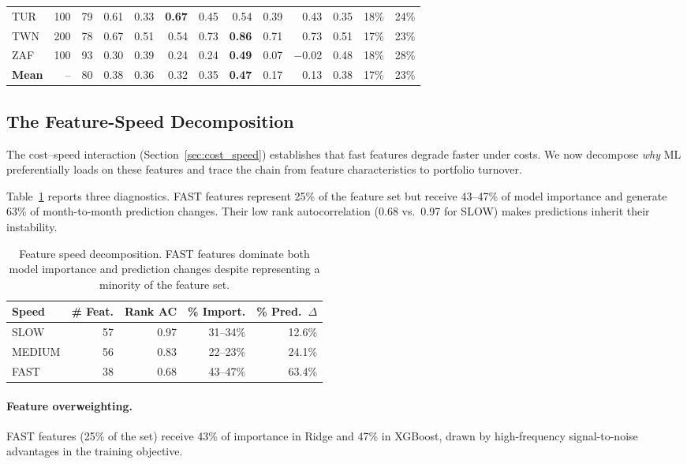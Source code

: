 \documentclass[sigconf,review,anonymous,balance=false]{acmart}
\begin{document}
\begin{table}[t]
{\begin{tabular}{@{}lrcrrrrrrrrrr@{}}
TUR & 100 & 79  & 0.61 &  0.33 &  \textbf{0.67}  &  0.45 &  0.54 &  0.39 &  0.43 &  0.35 & 18\% & 24\% \\
TWN & 200 & 78  & 0.67 &  0.51 &  0.54  &  0.73 &  \textbf{0.86} &  0.71 &  0.73 &  0.51 & 17\% & 23\% \\
ZAF & 100 & 93  & 0.30 &  0.39 &  0.24  &  0.24 &  \textbf{0.49} &  0.07 &$-$0.02 &  0.48 & 18\% & 28\% \\
\midrule
\textbf{Mean} & -- & 80 & 0.38 & 0.36 & 0.32 & 0.35 & \textbf{0.47} & 0.17 & 0.13 & 0.38 & 17\% & 23\% \\
\bottomrule
\end{tabular}%
}
\end{table}


\subsection{The Feature-Speed Decomposition}
\label{sec:mechanism}

The cost--speed interaction (Section~\ref{sec:cost_speed}) establishes
that fast features degrade faster under costs. We now decompose
\emph{why} ML preferentially loads on these features and trace the chain
from feature characteristics to portfolio turnover.

Table~\ref{tab:feature_speed} reports three diagnostics. FAST features
represent 25\% of the feature set but receive 43--47\% of model
importance and generate 63\% of month-to-month prediction changes.
Their low rank autocorrelation (0.68 vs.\ 0.97 for SLOW) makes
predictions inherit their instability.

\begin{table}[t]
\centering
\caption{Feature speed decomposition. FAST features dominate both
model importance and prediction changes despite representing a
minority of the feature set.}
\label{tab:feature_speed}
\begin{tabular}{@{}lrrrr@{}}
\toprule
Speed & \# Feat. & Rank AC & \% Import. & \% Pred.\ $\Delta$ \\
\midrule
SLOW   & 57 & 0.97 & 31--34\%  & 12.6\% \\
MEDIUM & 56 & 0.83 & 22--23\%  & 24.1\% \\
FAST   & 38 & 0.68 & 43--47\%  & 63.4\% \\
\bottomrule
\end{tabular}
\end{table}


\paragraph{Feature overweighting.}
FAST features (25\% of the set) receive 43\% of importance in
Ridge and 47\% in XGBoost, drawn by high-frequency signal-to-noise
advantages in the training objective.
\end{document}

